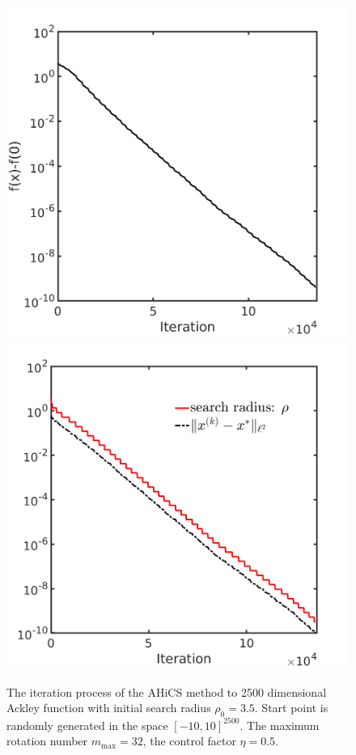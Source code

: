 \documentclass[final,1p,times]{elsarticle}
\begin{document}
\begin{figure}[!htbp] 
	\centering
	\includegraphics[scale=0.2]{../figures/ackley2500D.png}
	\includegraphics[scale=0.2]{../figures/ackley2500D_dist.png}
	  \caption{The iteration process of the AHiCS method to 2500
	  dimensional Ackley function with initial search
	  radius $\rho_0=3.5$. Start point is randomly generated in the
	  space $[-10, 10]^{2500}$. The maximum rotation number
	  $m_{\max}=32$, the control factor $\eta=0.5$.  } 
	\label{fig:ackley2500D:AHiCS}
\end{figure}
\end{document}
